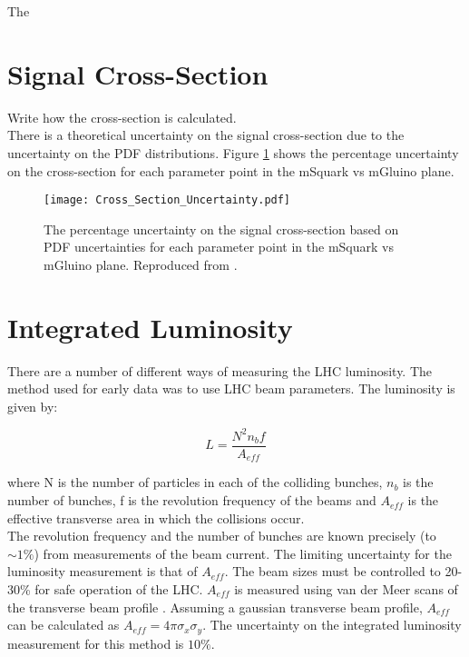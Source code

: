The 

\section{Signal Cross-Section}

Write how the cross-section is calculated. \\

There is a theoretical uncertainty on the signal cross-section due to the
uncertainty on the PDF distributions. Figure \ref{fig:xsec_unc} shows the
percentage uncertainty on the cross-section for each parameter point in the
mSquark vs mGluino plane.

\begin{figure}
\begin{center}
\texttt{[image: Cross\_Section\_Uncertainty.pdf]}
\end{center}
\caption{The percentage uncertainty on the signal cross-section based on PDF
uncertainties for each parameter point in the mSquark vs mGluino plane. 
Reproduced from \cite{ra3}.}
\label{fig:xsec_unc}
\end{figure}

\section{Integrated Luminosity}

There are a number of different ways of measuring the LHC luminosity. The method
used for early data was to use LHC beam parameters. The luminosity is given by:

\begin{equation}
L = \frac{N^{2}n_{b}f}{A_{eff}}
\label{eq:lumi}
\end{equation}

where N is the number of particles in each of the colliding bunches, $n_{b}$ is
the number of bunches, f is the revolution frequency of the beams and $A_{eff}$
is the effective transverse area in which the collisions occur. \\

The revolution frequency and the number of bunches are known precisely (to $\sim
1\%$) from measurements of the beam current. The limiting uncertainty for the
luminosity measurement is that of $A_{eff}$. The beam sizes must be controlled 
to 20-30\% for safe operation of the LHC. $A_{eff}$ is measured using van der 
Meer scans of the transverse beam profile \cite{vdm_scans}. Assuming a gaussian
transverse beam profile, $A_{eff}$ can be calculated as $A_{eff} = 
4\pi\sigma_{x}\sigma_{y}$. The uncertainty on the integrated luminosity 
measurement for this method is $10\%$. \\

